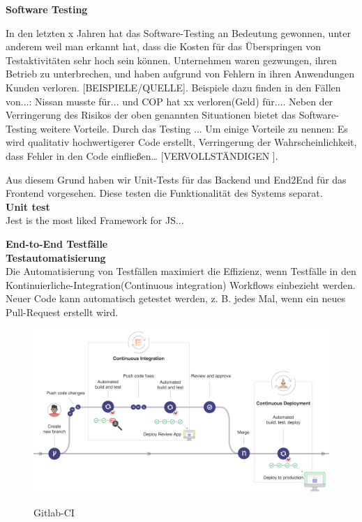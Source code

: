 \textbf{Software Testing }

In den letzten x Jahren hat das Software-Testing an Bedeutung gewonnen, unter anderem weil man erkannt hat, dass die Kosten für das Überspringen von Testaktivitäten sehr hoch sein können. Unternehmen waren gezwungen, ihren Betrieb zu unterbrechen, und haben aufgrund von Fehlern in ihren Anwendungen Kunden verloren. [BEISPIELE/QUELLE].
Beispiele dazu finden in den Fällen von...: 
Nissan musste für... und COP hat xx verloren(Geld) für....
Neben der Verringerung des Risikos der oben genannten Situationen bietet das Software-Testing weitere Vorteile. Durch das Testing ...
Um einige Vorteile zu nennen: Es wird qualitativ hochwertigerer Code erstellt, Verringerung der Wahrscheinlichkeit, dass Fehler in den Code einfließen… [VERVOLLSTÄNDIGEN ].

Aus diesem Grund haben wir Unit-Tests für das Backend und End2End für das Frontend vorgesehen. Diese testen die Funktionalität des Systems separat.
\\

\textbf{Unit test}\\
Jest is the most liked Framework for JS...

\textbf{End-to-End Testfälle}\\
\textbf{Testautomatisierung}\\
Die Automatisierung von Testfällen maximiert die Effizienz, wenn Testfälle in den Kontinuierliche-Integration(Continuous integration) Workflows einbezieht werden. Neuer Code kann automatisch getestet werden, z. B. jedes Mal, wenn ein neues Pull-Request erstellt wird.

\begin{figure}[ht]
	\centering
    \includegraphics[width=\textwidth]{sources/Gitlab-CI.png}\cite{MG10}
	\caption{Gitlab-CI}
	\label{Continuous integration workflow } {\cite{GLAB1}}
\end{figure}



